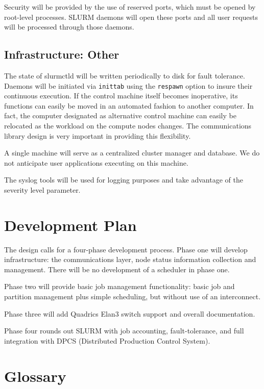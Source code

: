 Security will be provided by the use of reserved ports, which must be opened by
root-level processes. SLURM daemons will open these ports and all user requests
will be processed through those daemons. 

\subsection{Infrastructure: Other}

The state of slurmctld will be written periodically to disk for
fault tolerance. Daemons will be initiated via {\tt inittab} using 
the {\tt respawn} option to insure their continuous execution. 
If the control machine itself becomes inoperative, its functions can
easily be moved in an automated fashion to another computer. In fact, the
computer designated as alternative control machine can easily be relocated as
the workload on the compute nodes changes. The communications library design is
very important in providing this flexibility.

A single machine will serve as a centralized cluster manager and database. We
do not anticipate user applications executing on this machine. 

The syslog tools will be used for logging purposes and take advantage of the 
severity level parameter.

\section{Development Plan}

The design calls for a four-phase development process.  Phase one will
develop infrastructure: the communications layer, node status information 
collection and management.  There will be no development of a scheduler 
in phase one.

Phase two will provide basic job management functionality:  basic job and 
partition management plus simple scheduling, but without use of an
interconnect. 

Phase three will add Quadrics Elan3 switch support and overall documentation.  

Phase four rounds out SLURM with job accounting, fault-tolerance, 
and full integration with DPCS (Distributed Production Control System).

\appendix
\newpage

\section{Glossary}

